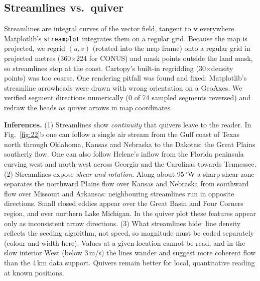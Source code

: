 \subsection{Streamlines vs.\ quiver}
Streamlines are integral curves of the vector field, tangent to $\mathbf{v}$ everywhere. Matplotlib's \texttt{streamplot}
integrates them on a regular grid. Because the map is projected, we regrid $(u,v)$ (rotated into the map frame) onto a
regular grid in projected metres (360$\times$224 for CONUS) and mask points outside the land mask, so streamlines stop at
the coast. Cartopy's built-in regridding (30$\times$density points) was too coarse. One rendering pitfall was found and
fixed: Matplotlib's streamline arrowheads were drawn with wrong orientation on a GeoAxes. We verified segment directions
numerically (0 of 74 sampled segments reversed) and redraw the heads as quiver arrows in map coordinates.


\textbf{Inferences.}
(1) Streamlines show \emph{continuity} that quivers leave to the reader. In Fig.~\ref{fig:22}b one can follow a single
air stream from the Gulf coast of Texas north through Oklahoma, Kansas and Nebraska to the Dakotas: the Great Plains
southerly flow. One can also follow Helene's inflow from the Florida peninsula curving west and north-west across Georgia and
the Carolinas towards Tennessee.
(2) Streamlines expose \emph{shear and rotation}. Along about 95\,$^\circ$W a sharp shear zone separates the northward Plains
flow over Kansas and Nebraska from southward flow over Missouri and Arkansas: neighbouring streamlines run in opposite
directions. Small closed eddies appear
over the Great Basin and Four Corners region, and over northern Lake Michigan. In the quiver plot these features appear only as
inconsistent arrow directions.
(3) What streamlines hide: line density reflects the seeding algorithm, not speed, so magnitude must be coded separately
(colour and width here). Values at a given location cannot be read, and in the slow interior West (below 3\,m/s) the lines
wander and suggest more coherent flow than the 4\,km data support. Quivers remain better for local, quantitative
reading at known positions.

